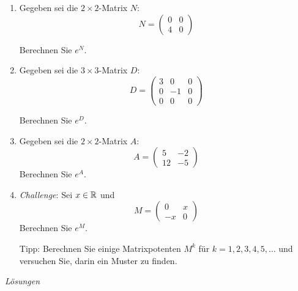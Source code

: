 \begin{ueb}
	{}{}
	\begin{enumerate}
		\item Gegeben sei die  $2 \times 2$-Matrix $N$:
		      \[
			      N = \begin{pmatrix} 0 & 0 \\ 4 & 0 \end{pmatrix}
		      \]

		      Berechnen Sie $e^N$.
		\item Gegeben sei die  $3 \times 3$-Matrix $D$:
		      \[
			      D = \begin{pmatrix} 3 & 0 & 0 \\ 0 & -1 & 0 \\ 0& 0 & 0 \end{pmatrix}
		      \]

		      Berechnen Sie $e^D$.
		\item Gegeben sei die  $2 \times 2$-Matrix $A$:
		      \[
			      A = \begin{pmatrix}
				      5  & -2 \\
				      12 & -5
			      \end{pmatrix}
		      \]
		      Berechnen Sie $e^A$.
		\item \emph{Challenge}: Sei $x\in\mathbb{R}$ und $$M = \begin{pmatrix}
				      0 & x \\-x & 0
			      \end{pmatrix}$$
		      Berechnen Sie $e^M$.

		      Tipp: Berechnen Sie einige Matrixpotenten $M^k$ für $k = 1, 2, 3, 4, 5, \dots$ und versuchen Sie, darin ein Muster zu finden.



	\end{enumerate}
\end{ueb}
\clearpage
\emph{Lösungen}
